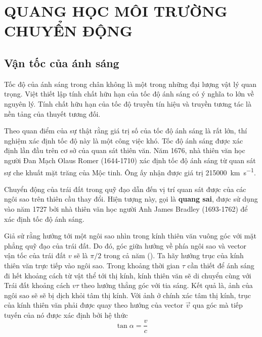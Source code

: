 
\chapter[QUANG HỌC MÔI TRƯỜNG CHUYỂN ĐỘNG]{QUANG HỌC MÔI TRƯỜNG CHUYỂN ĐỘNG}\label{chap:21}

\section{Vận tốc của ánh sáng}\label{sec:21_1}

Tốc độ của ánh sáng trong chân không là một trong những đại lượng vật lý quan trọng.
Việt thiết lập tính chất hữu hạn của tốc độ ánh sáng có ý nghĩa to lớn về nguyên lý.
Tính chất hữu hạn của tốc độ truyền tín hiệu và truyền tương tác là nền tảng của thuyết tương đối.

Theo quan điểm của sự thật rằng giá trị số của tốc độ ánh sáng là rất lớn, thí nghiệm xác định tốc độ này là một công việc khó.
Tốc độ ánh sáng được xác định lần đầu trên cơ sở của quan sát thiên văn.
Năm 1676, nhà thiên văn học người Đan Mạch Olaus Romer (1644-1710) xác định tốc độ ánh sáng từ quan sát sự che khuất mặt trăng của Mộc tinh.
Ông ấy nhận được giá trị \SI{215000}{km.s^{-1}}.

Chuyển động của trái đất trong quỹ đạo dẫn đến vị trí quan sát được của các ngôi sao trên thiên cầu thay đổi.
Hiện tượng này, gọi là \textbf{quang sai}, được sử dụng vào năm 1727 bởi nhà thiên văn học người Anh James Bradley (1693-1762) để xác định tốc độ ánh sáng.

Giả sử rằng hướng tới một ngôi sao nhìn trong kính thiên văn vuông góc với mặt phẳng quỹ đạo của trái đất.
Do đó, góc giữa hướng về phía ngôi sao và vector vận tốc của trái đất $v$ sẽ là $\pi/2$ trong cả năm ().
Ta hãy hướng trục của kính thiên văn trực tiếp vào ngôi sao.
Trong khoảng thời gian $\tau$ cần thiết để ánh sáng đi hết khoảng cách từ vật thể tới thị kính, kính thiên văn sẽ di chuyển cùng với Trái đất khoảng cách $v\tau$ theo hướng thẳng góc với tia sáng.
Kết quả là, ảnh của ngôi sao sẽ sẽ bị dịch khỏi tâm thị kính.
Với ảnh ở chính xác tâm thị kính, trục của kính thiên văn phải được quay theo hướng của vector $\vec{v}$ qua góc mà tiếp tuyến của nó được xác định bởi hệ thức
\begin{equation}\label{eq:21_1}
    \tan\alpha = \frac{v}{c}
\end{equation}

